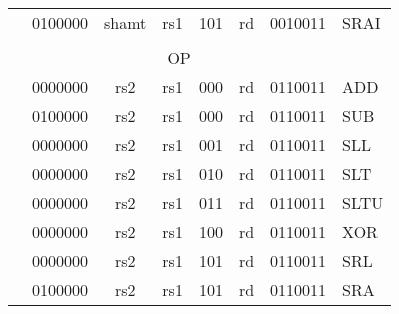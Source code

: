 \begin{table}[p]
\begin{small}
\begin{center}
\begin{tabular}{ccccccp{0.3in}p{0.3in}p{0.3in}cp{0.6in}l}
&
\multicolumn{4}{|c|}{0100000} &
\multicolumn{2}{c|}{shamt} &
\multicolumn{1}{c|}{rs1} &
\multicolumn{1}{c|}{101} &
\multicolumn{1}{c|}{rd} &
\multicolumn{1}{c|}{0010011} & SRAI \\
\cline{2-11}

&
\multicolumn{10}{c}{} & \\

&
\multicolumn{10}{c}{OP} & \\

\cline{2-11}
  

&
\multicolumn{4}{|c|}{0000000} &
\multicolumn{2}{c|}{rs2} &
\multicolumn{1}{c|}{rs1} &
\multicolumn{1}{c|}{000} &
\multicolumn{1}{c|}{rd} &
\multicolumn{1}{c|}{0110011} & ADD \\
\cline{2-11}
  

&
\multicolumn{4}{|c|}{0100000} &
\multicolumn{2}{c|}{rs2} &
\multicolumn{1}{c|}{rs1} &
\multicolumn{1}{c|}{000} &
\multicolumn{1}{c|}{rd} &
\multicolumn{1}{c|}{0110011} & SUB \\
\cline{2-11}
  

&
\multicolumn{4}{|c|}{0000000} &
\multicolumn{2}{c|}{rs2} &
\multicolumn{1}{c|}{rs1} &
\multicolumn{1}{c|}{001} &
\multicolumn{1}{c|}{rd} &
\multicolumn{1}{c|}{0110011} & SLL \\
\cline{2-11}
  

&
\multicolumn{4}{|c|}{0000000} &
\multicolumn{2}{c|}{rs2} &
\multicolumn{1}{c|}{rs1} &
\multicolumn{1}{c|}{010} &
\multicolumn{1}{c|}{rd} &
\multicolumn{1}{c|}{0110011} & SLT \\
\cline{2-11}
  

&
\multicolumn{4}{|c|}{0000000} &
\multicolumn{2}{c|}{rs2} &
\multicolumn{1}{c|}{rs1} &
\multicolumn{1}{c|}{011} &
\multicolumn{1}{c|}{rd} &
\multicolumn{1}{c|}{0110011} & SLTU \\
\cline{2-11}
  

&
\multicolumn{4}{|c|}{0000000} &
\multicolumn{2}{c|}{rs2} &
\multicolumn{1}{c|}{rs1} &
\multicolumn{1}{c|}{100} &
\multicolumn{1}{c|}{rd} &
\multicolumn{1}{c|}{0110011} & XOR \\
\cline{2-11}
  

&
\multicolumn{4}{|c|}{0000000} &
\multicolumn{2}{c|}{rs2} &
\multicolumn{1}{c|}{rs1} &
\multicolumn{1}{c|}{101} &
\multicolumn{1}{c|}{rd} &
\multicolumn{1}{c|}{0110011} & SRL \\
\cline{2-11}
  

&
\multicolumn{4}{|c|}{0100000} &
\multicolumn{2}{c|}{rs2} &
\multicolumn{1}{c|}{rs1} &
\multicolumn{1}{c|}{101} &
\multicolumn{1}{c|}{rd} &
\multicolumn{1}{c|}{0110011} & SRA \\
\cline{2-11}
  


\end{tabular}
\end{center}
\end{small}
\end{table}

